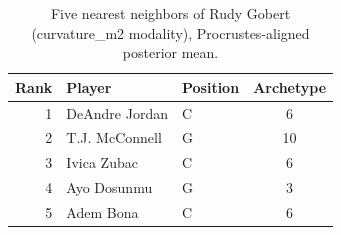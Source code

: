 \begin{table}[htbp]
  \centering\small
  \begin{tabular}{rllc}
    \toprule
    Rank & Player & Position & Archetype \\
    \midrule
    1 & DeAndre Jordan & C & 6 \\
    2 & T.J. McConnell & G & 10 \\
    3 & Ivica Zubac & C & 6 \\
    4 & Ayo Dosunmu & G & 3 \\
    5 & Adem Bona & C & 6 \\
    \bottomrule
  \end{tabular}
  \caption{Five nearest neighbors of Rudy Gobert (curvature_m2 modality), Procrustes-aligned posterior mean.}
  \label{tab:Rudy_Gobert_neighbors_curvature_m2}
\end{table}

